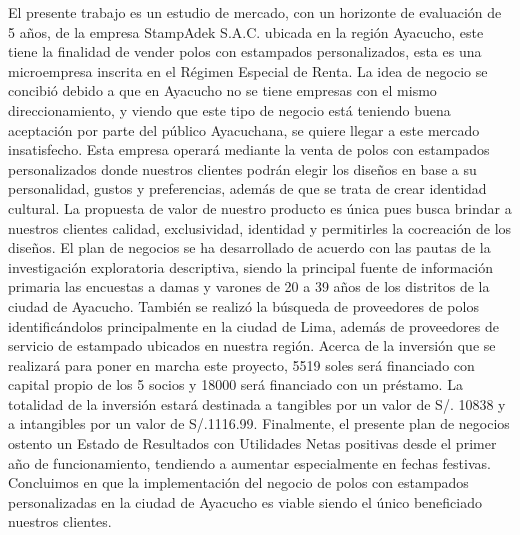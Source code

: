 \documentclass[a4paper,openright,12pt]{book}
\begin{document}
El presente trabajo es un estudio de mercado, con un horizonte de evaluación de 5 años, de la empresa StampAdek S.A.C. ubicada en la región Ayacucho, este tiene la finalidad de vender polos con estampados personalizados, esta es una microempresa inscrita en el Régimen Especial de Renta.
La idea de negocio se concibió debido a que en Ayacucho no se tiene empresas con el mismo direccionamiento, y viendo que este tipo de negocio está teniendo buena aceptación por parte del público Ayacuchana, se quiere llegar a este mercado insatisfecho.
Esta empresa operará mediante la venta de polos con estampados personalizados donde nuestros clientes podrán elegir los diseños en base a su personalidad, gustos y preferencias, además de que se trata de crear identidad cultural.
La propuesta de valor de nuestro producto es única pues busca brindar a nuestros clientes calidad, exclusividad, identidad y permitirles la cocreación de los diseños.
El plan de negocios se ha desarrollado de acuerdo con las pautas de la investigación exploratoria descriptiva, siendo la principal fuente de información primaria las encuestas a damas y varones de 20 a 39 años de los distritos de la ciudad de Ayacucho. También se realizó la búsqueda de proveedores de polos identificándolos principalmente en la ciudad de Lima, además de proveedores de servicio de estampado ubicados en nuestra región. 
 Acerca de la inversión que se realizará para poner en marcha este proyecto, 5519 soles será financiado con capital propio de los 5 socios y 18000 será financiado con un préstamo. La totalidad de la inversión estará destinada a tangibles por un valor de S/. 10838 y a intangibles por un valor de S/.1116.99. 
Finalmente, el presente plan de negocios ostento un Estado de Resultados con Utilidades Netas positivas desde el primer año de funcionamiento, tendiendo a aumentar especialmente en fechas festivas. Concluimos en que la implementación del negocio de polos con estampados personalizadas en la ciudad de Ayacucho es viable siendo el único beneficiado nuestros clientes.



\tableofcontents %

\cleardoublepage
{} %
\listoffigures %

\cleardoublepage
{} %
\listoftables %
\end{document}
